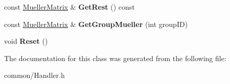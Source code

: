 \begin{DoxyCompactItemize}
const \mbox{\hyperlink{class_mueller_matrix}{Mueller\+Matrix}} \& {\bfseries Get\+Rest} () const
\item 
\mbox{\label{class_point_contribution_a2c37f49735530c8c80ebb30d4be5fca3}} 
const \mbox{\hyperlink{class_mueller_matrix}{Mueller\+Matrix}} \& {\bfseries Get\+Group\+Mueller} (int group\+ID)
\item 
\mbox{\label{class_point_contribution_ae50ca6c2e611ec63043ed3fc0f109aa5}} 
void {\bfseries Reset} ()
\end{DoxyCompactItemize}


The documentation for this class was generated from the following file\+:\begin{DoxyCompactItemize}
\item 
common/Handler.\+h\end{DoxyCompactItemize}
